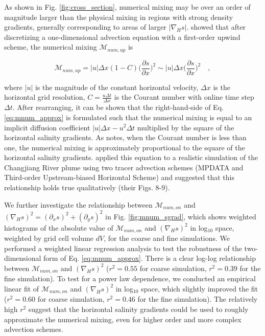 \documentclass[draft]{agujournal2019}
\begin{document}
As shown in Fig. \ref{fig:cross_section}, numerical mixing may be over an order of magnitude larger than the physical mixing in regions with strong density gradients, generally corresponding to areas of larger $|\nabla_H s|$.  showed that after discretizing a one-dimensional advection equation with a first-order upwind scheme, the numerical mixing $\mathcal{M}_{num, up}$ is
\begin{linenomath*}
\begin{equation} \label{eq:mnum_approx}
    \mathcal{M}_{num, up} = |u|\Delta x (1-C) \bigg(\frac{\partial s}{\partial x} \bigg)^2 \sim |u|\Delta x \bigg(\frac{\partial s}{\partial x} \bigg)^2 \quad ,
\end{equation}
\end{linenomath*}
where $|u|$ is the magnitude of the constant horizontal velocity, $\Delta x$ is the horizontal grid resolution, $C=\frac{u \Delta t}{\Delta x}$ is the Courant number with online time step $\Delta t$. After rearranging, it can be shown that the right-hand-side of Eq. \ref{eq:mnum_approx} is formulated such that the numerical mixing is equal to an implicit diffusion coefficient $|u|\Delta x-u^2 \Delta t$ multiplied by the square of the horizontal salinity gradients. As  notes, when the Courant number is less than one, the numerical mixing is approximately proportional to the square of the horizontal salinity gradients.  applied this equation to a realistic simulation of the Changjiang River plume using two tracer advection schemes (MPDATA and Third-order Upstream-biased Horizontal Scheme) and suggested that this relationship holds true qualitatively (their Figs. 8-9). 

We further investigate the relationship between $\mathcal{M}_{num, on}$ and $(\nabla_H s)^2 = (\partial_x s)^2+(\partial_y s)^2$ in Fig. \ref{fig:mnum_sgrad}, which shows weighted histograms of the absolute value of $\mathcal{M}_{num, on}$ and $(\nabla_H s)^2$ in log$_{10}$ space, weighted by grid cell volume $dV$, for the coarse and fine simulations. We performed a weighted linear regression analysis to test the robustness of the two-dimensional form of Eq. \ref{eq:mnum_approx}. There is a clear log-log relationship between $\mathcal{M}_{num, on}$ and $(\nabla_H s)^2$ ($r^2=0.55$ for coarse simulation, $r^2=0.39$ for the fine simulation). To test for a power law dependence, we conducted an empirical linear fit of $\mathcal{M}_{num, on}$ and $(\nabla_H s)^2$ in log$_{10}$ space, which slightly improved the fit ($r^2=0.60$ for coarse simulation, $r^2=0.46$ for the fine simulation). The relatively high $r^2$ suggest that the horizontal salinity gradients could be used to roughly approximate the numerical mixing, even for higher order and more complex advection schemes.
\end{document}
